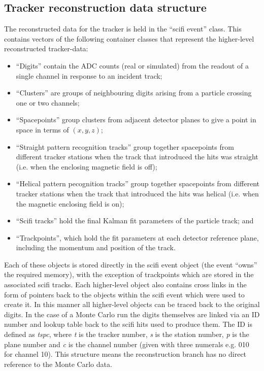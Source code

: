 \subsection{Tracker reconstruction data structure}
\label{subsec:TrackerReconDataStructure}
The reconstructed data for the tracker is held in the ``scifi event'' class.  This contains vectors of the following container classes that represent the higher-level reconstructed tracker-data:

\begin{itemize}
  \item ``Digits'' contain the ADC counts (real or simulated) from the readout of a single channel in response to an incident track;
  \item ``Clusters'' are groups of neighbouring digits arising from a particle crossing one or two channels;
  \item ``Spacepoints'' group clusters from adjacent detector planes to give a point in space in terms of $(x, y, z)$;
  \item ``Straight pattern recognition tracks'' group together spacepoints from different tracker stations when the track that introduced the hits was straight (i.e. when the enclosing  magnetic field is off); %
  \item ``Helical pattern pecognition tracks'' group together spacepoints from different tracker stations when the track that introduced the hits was helical (i.e. when the magnetic enclosing field is on); %
  \item ``Scifi tracks'' hold the final Kalman fit parameters of the particle track; and
  \item ``Trackpoints'', which hold the fit parameters at each detector reference plane, including the momentum and position of the track.
\end{itemize}

Each of these objects is stored directly in the scifi event object (the event ``owns'' the required memory), with the exception of trackpoints which are stored in the associated scifi tracks.  Each higher-level object also contains cross links in the form of pointers back to the objects within the scifi event which were used to create it. In this manner all higher-level objects can be traced back to the original digits.  In the case of a Monte Carlo run the digits themselves are linked via an ID number and lookup table back to the scifi hits used to produce them. The ID is defined as \textit{tspc}, where \textit{t} is the tracker number, \textit{s} is the station number, \textit{p} is the plane number and \textit{c} is the channel number (given with three numerals e.g. 010 for channel 10).  This structure means the reconstruction branch has no direct reference to the Monte Carlo data.